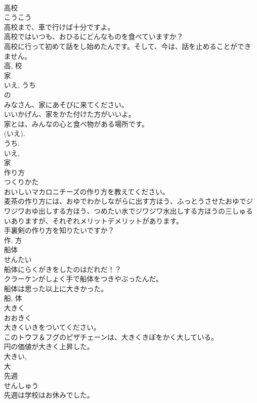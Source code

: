 \documentclass[8pt]{extreport}
\begin{document}
\begin{CJK}{UTF8}{min}
\\	高校	
\\	こうこう	
\\	高校まで、車で行けば十分ですよ。	
\\	高校ではいつも、おひるにどんなものを食べていますか？	
\\	高校に行って初めて話をし始めたんです。そして、今は、話を止めることができません。	
\\	高, 校	
\\	家	
\\	いえ, うち	
\\	の 
\\	みなさん、家にあそびに来てください。	
\\	いいかげん、家をかた付けた方がいいよ。	
\\	家とは、みんなの心と食べ物がある場所です。	
\\	(いえ). 
\\	うち. 
\\	いえ, 
\\	家	
\\	作り方	
\\	つくりかた	
\\	おいしいマカロニチーズの作り方を教えてください。	
\\	麦茶の作り方には、おゆでわかしながらに出す方ほう、ふっとうさせたおゆでジワジワおゆ出しする方ほう、つめたい水でジワジワ水出しする方ほうの三しゅるいありますが、それぞれメリットデメリットがあります。	
\\	手裏剣の作り方を知りたいですか？	
\\	作, 方	
\\	船体	
\\	せんたい	
\\	船体にらくがきをしたのはだれだ！？	
\\	クラーケンがしょく手で船体をつきやぶったんだ。	
\\	船体は思った以上に大きかった。	
\\	船, 体	
\\	大きく	
\\	おおきく	
\\	大きくいきをついてください。	
\\	このトウフ＆フグのピザチェーンは、大きくきぼをかく大している。	
\\	円の価値が大きく上昇した。	
\\	大きい, 
\\	大	
\\	先週	
\\	せんしゅう	
\\	先週は学校はお休みでした。	

\end{CJK}
\end{document}
